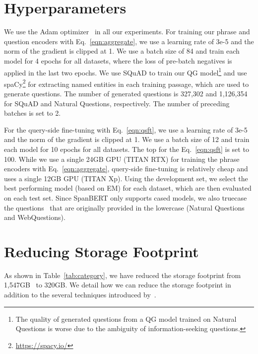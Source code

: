 \documentclass[11pt,a4paper]{article}
\begin{document}
\section{Hyperparameters}\label{apdx:hyper}
We use the Adam optimizer~\citep{kingma2014adam} in all our experiments.
For training our phrase and question encoders with Eq.~\eqref{eqn:aggregate}, we use a learning rate of 3e-5 and the norm of the gradient is clipped at 1.
We use a batch size of 84 and train each model for 4 epochs for all datasets, where the loss of pre-batch negatives is applied in the last two epochs.
We use SQuAD to train our QG model\footnote{The quality of generated questions from a QG model trained on Natural Questions is worse due to the ambiguity of information-seeking questions.} and use spaCy\footnote{\url{https://spacy.io/}} for extracting named entities in each training passage, which are used to generate questions.
The number of generated questions is 327,302 and 1,126,354 for SQuAD and Natural Questions, respectively.
The number of preceding batches  is set to 2.

For the query-side fine-tuning with Eq.~\eqref{eqn:qsft}, we use a learning rate of 3e-5 and the norm of the gradient is clipped at 1.
We use a batch size of 12 and train each model for 10 epochs for all datasets.
The top  for the Eq.~\eqref{eqn:qsft} is set to 100.
While we use a single 24GB GPU (TITAN RTX) for training the phrase encoders with Eq.~\eqref{eqn:aggregate}, query-side fine-tuning is relatively cheap and uses a single 12GB GPU (TITAN Xp).
Using the development set, we select the best performing model (based on EM) for each dataset, which are then evaluated on each test set.
Since SpanBERT only supports cased models, we also truecase the questions~\citep{lita2003truecasing} that are originally provided in the lowercase (Natural Questions and WebQuestions).









\section{Reducing Storage Footprint}\label{apdx:storage}
As shown in Table~\ref{tab:category}, we have reduced the storage footprint from 1,547GB~\citep{lee2020contextualized} to 320GB.
We detail how we can reduce the storage footprint in addition to the several techniques introduced by~\citet{seo2019real}.
\end{document}
